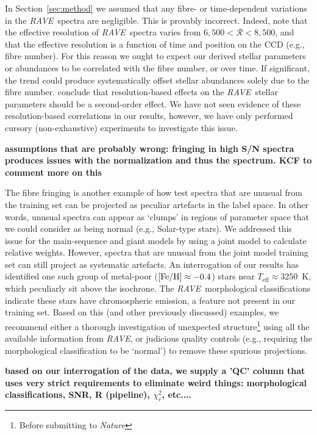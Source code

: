 \documentclass[preprint,trackchanges]{aastex}
\newcommand{\acronym}[1]{{\small{#1}}}
\newcommand{\project}[1]{\textsl{#1}}
\newcommand{\rave}{\project{\acronym{RAVE}}}
\newcommand{\stub}[1]{{\color{blue} \textbf{#1}}}
\newcommand{\teff}{T_{\mathrm{eff}}}
\begin{document}
In Section~\ref{sec:method} we assumed that any fibre- or time-dependent variations
in the \rave\ spectra are negligible.  This is provably incorrect. Indeed,
\citet{Kordopatis_2013} note that the effective resolution of \rave\
spectra varies from $6{,}500 < \mathcal{R} < 8{,}500$, and that the 
effective resolution is a function of time and position on the CCD (e.g., fibre number).  For this reason we ought to expect our derived stellar
parameters or abundances to be correlated with the fibre number, or over
time.  If significant, the trend could produce systematically offset
stellar abundances solely due to the fibre number.  \citet{Kordopatis_2013}
conclude that resolution-based effects on the \rave\ stellar parameters
should be a second-order effect. We have not seen evidence of these 
resolution-based correlations in our results, however, we have only
performed cursory (non-exhaustive) experiments to investigate this issue.


\stub{assumptions that are probably wrong: fringing in high S/N spectra produces issues with the normalization and thus the spectrum. KCF to comment more on this}


The fibre fringing is another example of how test spectra that are
unusual from the training set can be projected as peculiar artefacts in the
label space.  In other words, unusual spectra can appear as `clumps' in
regions of parameter space that we could consider as being normal 
(e.g., Solar-type stars).  We addressed this issue for the main-sequence
and giant models by using a joint model to calculate relative weights.
However, spectra that are unusual from the joint model training set can
still project as systematic artefacts.  An interrogation of our results
has identified one such group of metal-poor ($[{\rm Fe/H}] \approx -0.4$)
stars near $\teff \approx 3250$~K, which peculiarly sit above the isochrone. 
The \rave\ morphological classifications \citep{Matijevic_2012} indicate 
these stars have chromospheric emission, a feature not present in our 
training set.  Based on this (and other previously discussed) examples,
we recommend either a thorough investigation of unexpected structure\footnote{
Before submitting to \emph{Nature}} 
using all the available 
information from \rave, or judicious quality controls (e.g., requiring the 
morphological classification to be `normal') to remove these spurious projections.


\stub{based on our interrogation of the data, we supply a 'QC' column that uses very strict requirements to eliminate weird things: morphological classifications, SNR, R (pipeline), $\chi_r^2$, etc....}
\end{document}
